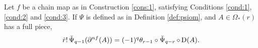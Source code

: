 %

\begin{proposition}\label{prop:condition} Let $f$ be a chain map as in Construction \ref{cons:1}, satisfying Conditions \eqref{cond:1}, \eqref{cond:2} and \eqref{cond:3}. If $\Psi$ is defined as in Definition \ref{def:psiom}, and $A\in \Omega_*(r)$ has a full piece,
	\[
	\tilde{r}!\operatorname{\check{\Psi}}_{q-1}(\partial^{nf} (A)) = (-1)^q\theta_{r-1}\circ \operatorname{\check{\Psi}}_{q-r}\circ\operatorname{D}(A).
	\]
\end{proposition}


